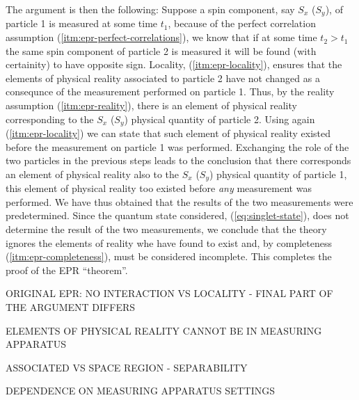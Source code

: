 The argument is then the following: Suppose a spin component, say $S_x$ ($S_y$), of particle 1 is measured at some time $t_1$, because of the perfect correlation assumption (\ref{itm:epr-perfect-correlations}), we know that if at some time $t_2 > t_1$ the same spin component of particle 2 is measured it will be found (with certainity) to have opposite sign. Locality, (\ref{itm:epr-locality}), ensures that the elements of physical reality associated to particle 2 have not changed as a consequnce of the measurement performed on particle 1. Thus, by the reality assumption (\ref{itm:epr-reality}), there is an element of physical reality corresponding to the $S_x$ ($S_y$) physical quantity of particle 2. Using again (\ref{itm:epr-locality}) we can state that such element of physical reality existed before the measurement on particle 1 was performed. Exchanging the role of the two particles in the previous steps leads to the conclusion that there corresponds an element of physical reality also to the $S_x$ ($S_y$) physical quantity of particle 1, this element of physical reality too existed before \textit{any} measurement was performed. We have thus obtained that the results of the two measurements were predetermined. Since the quantum state considered, (\ref{eq:singlet-state}), does not determine the result of the two measurements, we conclude that the theory ignores the elements of reality whe have found to exist and, by completeness (\ref{itm:epr-completeness}), must be considered incomplete. This completes the proof of the EPR ``theorem''.%

\begin{observation}
  ORIGINAL EPR: NO INTERACTION VS LOCALITY - FINAL PART OF THE ARGUMENT DIFFERS
\end{observation}

\begin{observation}
  ELEMENTS OF PHYSICAL REALITY CANNOT BE IN MEASURING APPARATUS \cite{}
\end{observation}

\begin{observation}
  ASSOCIATED VS SPACE REGION - SEPARABILITY
\end{observation}

\begin{observation}
  DEPENDENCE ON MEASURING APPARATUS SETTINGS
\end{observation}
